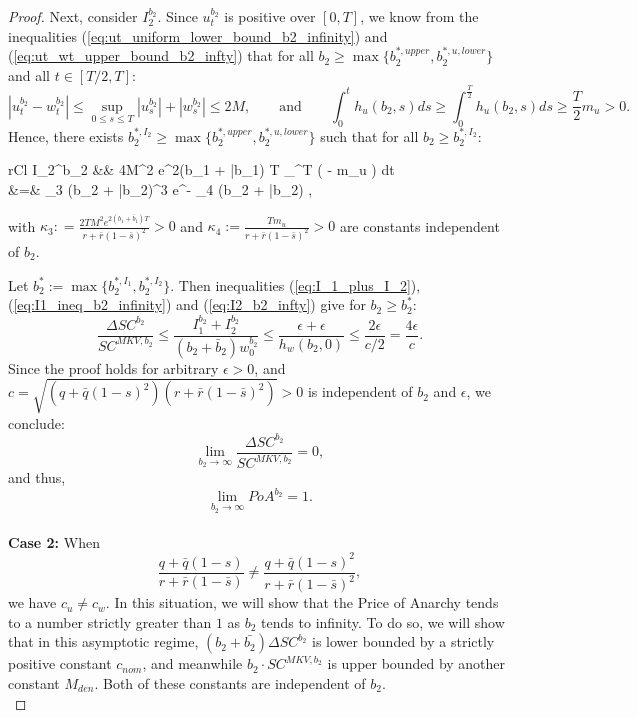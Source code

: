 \documentclass[11pt]{article}
\begin{document}
\begin{proof}
	Next, consider $I_2^{b_2}$. Since $u_t^{b_2}$ is positive over $[0,T]$, we know from the inequalities (\ref{eq:ut_uniform_lower_bound_b2_infinity}) and (\ref{eq:ut_wt_upper_bound_b2_infty}) that for all $b_2 \geq \max\{ b_2^{*,upper}, b_2^{*,u,lower} \}$ and all $t \in [T/2,T]$:
	\begin{equation*}
		\left\vert u_t^{b_2} - w_t^{b_2} \right\vert \leq \sup_{0 \leq s \leq T} \left\vert u_s^{b_2} \right\vert + \left\vert w_s^{b_2} \right\vert  \leq 2M,
		\qquad \text{and} \qquad
		\int_0^{t} h_u(b_2,s) ds \geq \int_0^{\frac{T}{2}} h_u(b_2,s) ds \geq \frac{T}{2} m_u >0.
	\end{equation*}
	Hence, there exists $b_2^{*,I_2} \geq \max \{ b_2^{*,upper}, b_2^{*,u,lower} \}$ such that for all $b_2 \geq b_2^{*,I_2}$:
	\begin{IEEEeqnarray}{rCl}
		I_2^{b_2} &\leq&   \cdot 4M^2 e^{2(b_1 + \bar{b}_1) T} \int_{}^{T} \exp\left( -  \cdot m_u \right) dt \nonumber\\	
		&=& \kappa_3 (b_2 + \bar{b}_2)^3 e^{- \kappa_4 (b_2 + \bar{b}_2)} \leq \epsilon,
	\label{eq:I2_b2_infty}
	\end{IEEEeqnarray}
	with $\kappa_3: = \frac{2 TM^2 e^{2(b_1 + \bar{b}_1) T} }{r + \bar{r}(1-\bar{s})^2} >0$ and $\kappa_4 :=  \frac{T  m_u}{r + \bar{r}(1-\bar{s})^2}>0$ are constants independent of $b_2$. 	
	
	Let $b_2^* := \max \{ b_2^{*,I_1}, b_2^{*,I_2}\}$. Then inequalities (\ref{eq:I_1_plus_I_2}), (\ref{eq:I1_ineq_b2_infinity}) and (\ref{eq:I2_b2_infty}) give for $b_2 \geq b_2^*$:
	\begin{equation*}
		\frac{\Delta SC^{b_2}}{SC^{MKV,b_2}} \leq \frac{I_1^{b_2} + I_2^{b_2}}{(b_2 + \bar{b}_2) w_0^{b_2}} \leq \frac{ \epsilon + \epsilon }{h_w(b_2,0)} \leq \frac{2\epsilon}{c/2}=\frac{4\epsilon}{c}.
	\end{equation*}
	Since the proof holds for arbitrary $\epsilon>0$, and $c=\sqrt{(q+\bar{q}(1-s)^2)(r+\bar{r}(1-\bar{s})^2)}>0$ is independent of $b_2$ and $\epsilon$, we conclude:
	\begin{equation*}
		\lim_{b_2 \to \infty} \frac{\Delta SC^{b_2}}{SC^{MKV,b_2}} = 0, 
	\end{equation*}
	and thus,
	$$ \lim_{b_2 \to \infty} PoA^{b_2} = 1.$$\\
	
	\textbf{Case 2:} When
	\begin{equation*}
	\frac{q+\bar{q}(1-s)}{r+\bar{r}(1-\bar{s})} \neq \frac{q+\bar{q}(1-s)^2}{r+\bar{r}(1-\bar{s})^2},
	\end{equation*}
	we have $c_u \neq c_w$. In this situation, we will show that the Price of Anarchy tends to a number strictly greater than $1$ as $b_2$ tends to infinity. To do so, we will show that in this asymptotic regime, $(b_2 + \bar{b_2}) \Delta SC^{b_2}$ is lower bounded by a strictly positive constant $c_{nom}$, and meanwhile $b_2 \cdot SC^{MKV,b_2}$ is upper bounded by another constant $M_{den}$. Both of these constants are independent of $b_2$.\\
	

\end{proof}
\end{document}
